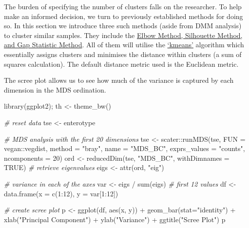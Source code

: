 \documentclass[
  oneside]{book}
\newenvironment{Shaded}{\begin{snugshade}}{\end{snugshade}}
\newcommand{\AttributeTok}[1]{\textcolor[rgb]{0.77,0.63,0.00}{#1}}
\newcommand{\CommentTok}[1]{\textcolor[rgb]{0.56,0.35,0.01}{\textit{#1}}}
\newcommand{\ConstantTok}[1]{\textcolor[rgb]{0.00,0.00,0.00}{#1}}
\newcommand{\DecValTok}[1]{\textcolor[rgb]{0.00,0.00,0.81}{#1}}
\newcommand{\FunctionTok}[1]{\textcolor[rgb]{0.00,0.00,0.00}{#1}}
\newcommand{\NormalTok}[1]{#1}
\newcommand{\OtherTok}[1]{\textcolor[rgb]{0.56,0.35,0.01}{#1}}
\newcommand{\SpecialCharTok}[1]{\textcolor[rgb]{0.00,0.00,0.00}{#1}}
\newcommand{\StringTok}[1]{\textcolor[rgb]{0.31,0.60,0.02}{#1}}
\begin{document}
The burden of specifying the number of clusters falls on the researcher. To help make an informed decision, we turn to previously established methods for doing so. In this section we introduce three such methods (aside from DMM analysis) to cluster similar samples. They include the \href{https://uc-r.github.io/kmeans_clustering}{Elbow Method, Silhouette Method, and Gap Statistic Method}. All of them will utilise the \href{https://uc-r.github.io/kmeans_clustering}{`kmeans'} algorithm which essentially assigns clusters and minimises the distance within clusters (a sum of squares calculation). The default distance metric used is the Euclidean metric.

The scree plot allows us to see how much of the variance is captured by each dimension in the MDS ordination.

\begin{Shaded}
\begin{Highlighting}[]
\FunctionTok{library}\NormalTok{(ggplot2); th }\OtherTok{\textless{}{-}} \FunctionTok{theme\_bw}\NormalTok{()}

\CommentTok{\# reset data}
\NormalTok{tse }\OtherTok{\textless{}{-}}\NormalTok{ enterotype}

\CommentTok{\# MDS analysis with the first 20 dimensions}
\NormalTok{tse  }\OtherTok{\textless{}{-}}\NormalTok{ scater}\SpecialCharTok{::}\FunctionTok{runMDS}\NormalTok{(tse, }\AttributeTok{FUN =}\NormalTok{ vegan}\SpecialCharTok{::}\NormalTok{vegdist, }\AttributeTok{method =} \StringTok{"bray"}\NormalTok{, }
                       \AttributeTok{name =} \StringTok{"MDS\_BC"}\NormalTok{, }\AttributeTok{exprs\_values =} \StringTok{"counts"}\NormalTok{, }\AttributeTok{ncomponents =} \DecValTok{20}\NormalTok{)}
\NormalTok{ord  }\OtherTok{\textless{}{-}} \FunctionTok{reducedDim}\NormalTok{(tse, }\StringTok{"MDS\_BC"}\NormalTok{, }\AttributeTok{withDimnames =} \ConstantTok{TRUE}\NormalTok{)}
\CommentTok{\# retrieve eigenvalues}
\NormalTok{eigs }\OtherTok{\textless{}{-}} \FunctionTok{attr}\NormalTok{(ord, }\StringTok{"eig"}\NormalTok{)}

\CommentTok{\# variance in each of the axes}
\NormalTok{var }\OtherTok{\textless{}{-}}\NormalTok{ eigs }\SpecialCharTok{/} \FunctionTok{sum}\NormalTok{(eigs)}
\CommentTok{\# first 12 values}
\NormalTok{df }\OtherTok{\textless{}{-}} \FunctionTok{data.frame}\NormalTok{(}\AttributeTok{x =} \FunctionTok{c}\NormalTok{(}\DecValTok{1}\SpecialCharTok{:}\DecValTok{12}\NormalTok{), }\AttributeTok{y =}\NormalTok{ var[}\DecValTok{1}\SpecialCharTok{:}\DecValTok{12}\NormalTok{])}

\CommentTok{\# create scree plot}
\NormalTok{p }\OtherTok{\textless{}{-}} \FunctionTok{ggplot}\NormalTok{(df, }\FunctionTok{aes}\NormalTok{(x, y)) }\SpecialCharTok{+}
     \FunctionTok{geom\_bar}\NormalTok{(}\AttributeTok{stat=}\StringTok{"identity"}\NormalTok{) }\SpecialCharTok{+}
     \FunctionTok{xlab}\NormalTok{(}\StringTok{"Principal Component"}\NormalTok{) }\SpecialCharTok{+}
     \FunctionTok{ylab}\NormalTok{(}\StringTok{"Variance"}\NormalTok{) }\SpecialCharTok{+}
     \FunctionTok{ggtitle}\NormalTok{(}\StringTok{"Scree Plot"}\NormalTok{)}
\NormalTok{p}
\end{Highlighting}
\end{Shaded}
\end{document}
